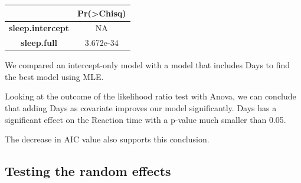 \documentclass[
]{article}
\begin{document}
\begin{longtable}[]{@{}cc@{}}
\toprule
\begin{minipage}[b]{0.29\columnwidth}\centering
~\strut
\end{minipage} & \begin{minipage}[b]{0.17\columnwidth}\centering
Pr(\textgreater Chisq)\strut
\end{minipage}\tabularnewline
\midrule
\endhead
\begin{minipage}[t]{0.29\columnwidth}\centering
\textbf{sleep.intercept}\strut
\end{minipage} & \begin{minipage}[t]{0.17\columnwidth}\centering
NA\strut
\end{minipage}\tabularnewline
\begin{minipage}[t]{0.29\columnwidth}\centering
\textbf{sleep.full}\strut
\end{minipage} & \begin{minipage}[t]{0.17\columnwidth}\centering
3.672e-34\strut
\end{minipage}\tabularnewline
\bottomrule
\end{longtable}

We compared an intercept-only model with a model that includes Days to
find the best model using MLE.

Looking at the outcome of the likelihood ratio test with Anova, we can
conclude that adding Days as covariate improves our model significantly.
Days has a significant effect on the Reaction time with a p-value much
smaller than 0.05.

The decrease in AIC value also supports this conclusion.

\hypertarget{testing-the-random-effects}{%
\subsection{Testing the random
effects}\label{testing-the-random-effects}}
\end{document}
